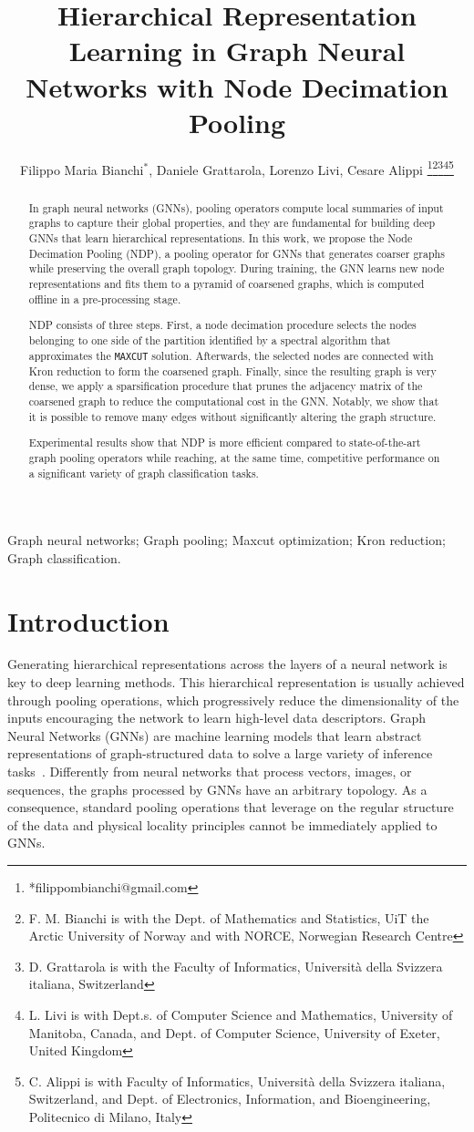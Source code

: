 \documentclass[journal]{IEEEtran}
\title{Hierarchical Representation Learning in Graph Neural Networks with Node Decimation Pooling}
\author{Filippo Maria Bianchi$^{*}$, Daniele Grattarola, Lorenzo Livi, Cesare Alippi \thanks{*filippombianchi@gmail.com}\thanks{F. M. Bianchi is with the Dept. of Mathematics and Statistics, UiT the Arctic University of Norway and with NORCE, Norwegian Research Centre}\thanks{D. Grattarola is with the Faculty of Informatics, Universit\`a della Svizzera italiana, Switzerland}\thanks{L. Livi is with Dept.s. of Computer Science and Mathematics, University of Manitoba, Canada, and Dept. of Computer Science, University of Exeter, United Kingdom}\thanks{C. Alippi is with Faculty of Informatics, Universit\`a della Svizzera italiana, Switzerland, and Dept. of Electronics, Information, and Bioengineering, Politecnico di Milano, Italy}}
\newcommand{\maxcut}{\texttt{\small{MAXCUT}}}
\begin{document}
\maketitle

\begin{abstract}
In graph neural networks (GNNs), pooling operators compute local summaries of input graphs to capture their global properties, and they are fundamental for building deep GNNs that learn hierarchical representations. 
In this work, we propose the Node Decimation Pooling (NDP), a pooling operator for GNNs that generates coarser graphs while preserving the overall graph topology. 
During training, the GNN learns new node representations and fits them to a pyramid of coarsened graphs, which is computed offline in a pre-processing stage.

NDP consists of three steps. 
First, a node decimation procedure selects the nodes belonging to one side of the partition identified by a spectral algorithm that approximates the \maxcut{} solution.
Afterwards, the selected nodes are connected with Kron reduction to form the coarsened graph.
Finally, since the resulting graph is very dense, we apply a sparsification procedure that prunes the adjacency matrix of the coarsened graph to reduce the computational cost in the GNN.
Notably, we show that it is possible to remove many edges without significantly altering the graph structure.

Experimental results show that NDP is more efficient compared to state-of-the-art graph pooling operators while reaching, at the same time, competitive performance on a significant variety of graph classification tasks. 
\end{abstract}
\begin{IEEEkeywords}
Graph neural networks; Graph pooling; Maxcut optimization; Kron reduction; Graph classification.
\end{IEEEkeywords}

\section{Introduction}

Generating hierarchical representations across the layers of a neural network is key to deep learning methods. This hierarchical representation is usually achieved through pooling operations, which progressively reduce the dimensionality of the inputs encouraging the network to learn high-level data descriptors.
Graph Neural Networks (GNNs) are machine learning models that learn abstract representations of graph-structured data to solve a large variety of inference tasks~\cite{7974879, zhang2019depth, bai2019learning, bai2019deep, zhang2018end}.
Differently from neural networks that process vectors, images, or sequences, the graphs processed by GNNs have an arbitrary topology. 
As a consequence, standard pooling operations that leverage on the regular structure of the data and physical locality principles cannot be immediately applied to GNNs. 
\end{document}
